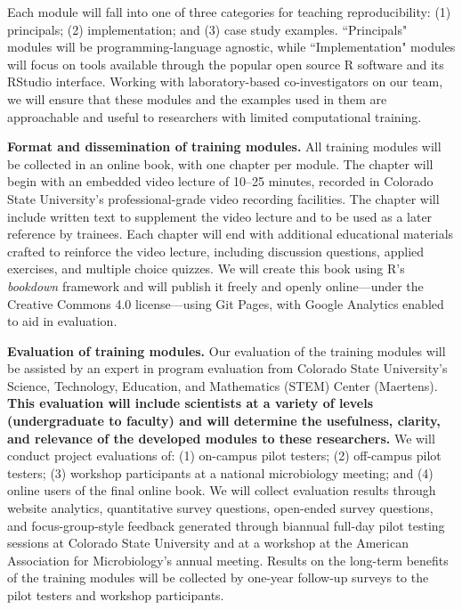\documentclass[pdftex,english,11pt,parskip=half]{scrartcl}
\begin{document}
Each module will fall into one of three categories for teaching reproducibility: (1) principals; (2) implementation; and (3) case study examples. ``Principals" modules will be programming-language agnostic, while ``Implementation" modules will focus on tools available through the popular open source R software and its RStudio interface. Working with laboratory-based co-investigators on our team, we will ensure that these modules and the examples used in them are approachable and useful to researchers with limited computational training.  

\textbf{Format and dissemination of training modules.} All training modules will be collected in an online book, with one chapter per module. The chapter will begin with an embedded video lecture of 10--25 minutes, recorded in Colorado State University's professional-grade video recording facilities. The chapter will include written text to supplement the video lecture and to be used as a later reference by trainees. Each chapter will end with additional educational materials crafted to reinforce the video lecture, including discussion questions, applied exercises, and multiple choice quizzes. We will create this book using R's \textit{bookdown} framework and will publish it freely and openly online---under the Creative Commons 4.0 license---using Git Pages, with Google Analytics enabled to aid in evaluation. 

\textbf{Evaluation of training modules.} Our evaluation of the training modules will be assisted by an expert in program evaluation from Colorado State University's Science, Technology, Education, and Mathematics (STEM) Center (Maertens). \textbf{This evaluation will include scientists at a variety of levels (undergraduate to faculty) and will determine the usefulness, clarity, and relevance of the developed modules to these researchers.} We will conduct project evaluations of: (1) on-campus pilot testers; (2) off-campus pilot testers; (3) workshop participants at a national microbiology meeting; and (4) online users of the final online book. We will collect evaluation results through website analytics, quantitative survey questions, open-ended survey questions, and focus-group-style feedback generated through biannual full-day pilot testing sessions at Colorado State University and at a workshop at the American Association for Microbiology's annual meeting. Results on the long-term benefits of the training modules will be collected by one-year follow-up surveys to the pilot testers and workshop participants.
\end{document}
